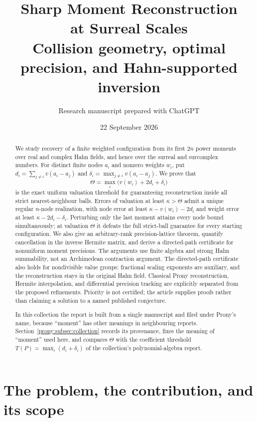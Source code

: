 \documentclass[11pt,letterpaper]{article}
\title{\textbf{Sharp Moment Reconstruction\\at Surreal Scales}\\[5pt]
\large Collision geometry, optimal precision, and Hahn-supported inversion}
\author{Research manuscript prepared with ChatGPT}
\date{22 September 2026}
\theoremstyle{definition}
\theoremstyle{remark}
\begin{document}
\maketitle
\begin{abstract}
We study recovery of a finite weighted configuration from its first $2n$ power
moments over real and complex Hahn fields, and hence over the surreal and
surcomplex numbers. For distinct finite nodes $a_i$ and nonzero weights $w_i$,
put $d_i=\sum_{j\ne i}v(a_i-a_j)$ and
$\delta_i=\max_{j\ne i}v(a_i-a_j)$. We prove that
\[
 \Theta=\max_i\bigl(v(w_i)+2d_i+\delta_i\bigr)
\]
is the exact uniform valuation threshold for guaranteeing reconstruction
inside all strict nearest-neighbour balls. Errors of valuation at least
$\kappa>\Theta$ admit a unique regular $n$-node realization, with node error
at least $\kappa-v(w_i)-2d_i$ and weight error at least
$\kappa-2d_i-\delta_i$. Perturbing only the last moment attains every node bound
simultaneously; at valuation $\Theta$ it defeats the full strict-ball
guarantee for every starting configuration. We also give an arbitrary-rank
precision-lattice theorem, quantify cancellation in the inverse Hermite
matrix, and derive a directed-path certificate for nonuniform moment
precisions. The arguments use finite algebra and strong Hahn summability,
not an Archimedean contraction argument. The directed-path certificate also
holds for nondivisible value groups: fractional scaling exponents are
auxiliary, and the reconstruction stays in the original Hahn field. Classical Prony reconstruction,
Hermite interpolation, and differential precision tracking are explicitly
separated from the proposed refinements. Priority is not certified; the
article supplies proofs rather than claiming a solution to a named
published conjecture.

In this collection the report is built from a single manuscript and filed
under Prony's name, because ``moment'' has other meanings in neighbouring
reports. Section~\ref{prony:subsec:collection} records its provenance, fixes
the meaning of ``moment'' used here, and compares $\Theta$ with the
coefficient threshold $T(P)=\max_i(d_i+\delta_i)$ of the collection's
polynomial-algebra report.
\end{abstract}
\tableofcontents
\newpage

\section{The problem, the contribution, and its scope}
\label{prony:sec:intro}
\end{document}
